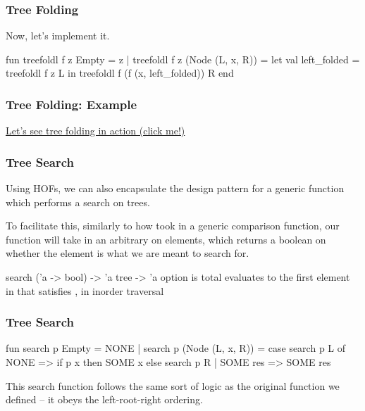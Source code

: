 \documentclass[aspectratio=169]{beamer}
\begin{document}
\begin{frame}[fragile]
  \frametitle{Tree Folding}

  Now, let's implement it.

  \pause
  \vspace{\fill}

  \begin{codeblock}
    fun treefoldl f z Empty = z
      | treefoldl f z (Node (L, x, R)) =
          let
            val left_folded = treefoldl f z L
          in
            treefoldl f (f (x, left_folded)) R
          end
  \end{codeblock}
\end{frame}

\begin{frame}[fragile]
  \frametitle{Tree Folding: Example}

  {\color{blue}\href{https://asciinema.org/a/vb4tp7vH1aFMNHKabkex1TsJH}{Let's see tree folding in action (click me!)}}

\end{frame}

\begin{frame}[fragile]
  \frametitle{Tree Search}

  Using HOFs, we can also encapsulate the design pattern for a generic function which
  performs a search on trees.

  \pause
  \vspace{\fill}

  To facilitate this, similarly to how  took in a generic comparison function,
  our  function will take in an arbitrary  on elements, which
  returns a boolean on whether the element is what we are meant to search for.

  \pause
  \vspace{\fill}

  \spec
    {search}
    {('a -> bool) -> 'a tree -> 'a option}
    { is total}
    { evaluates to the first element in  that satisfies , in
    inorder traversal}
\end{frame}

\begin{frame}[fragile]
  \frametitle{Tree Search}

  \rprs

  \begin{codeblock}
    fun search p Empty = NONE
      | search p (Node (L, x, R)) =
        case search p L of
          NONE =>
            if p x then SOME x
            else search p R
        | SOME res => SOME res
  \end{codeblock}

  \vspace{\fill}

  This search function follows the same sort of logic as the original
   function we defined -- it obeys the left-root-right ordering.
\end{frame}
\end{document}
